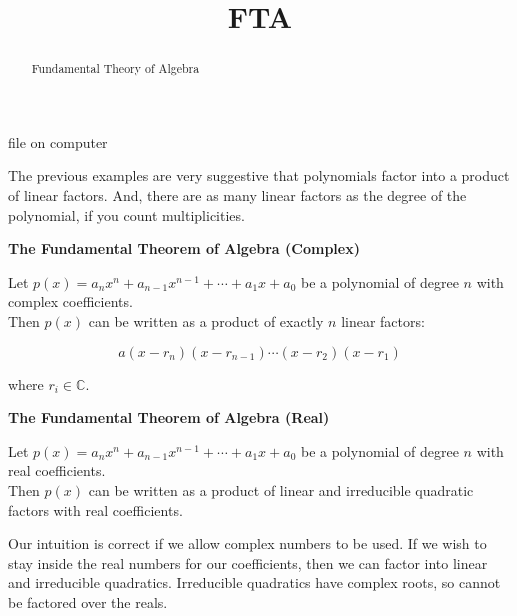 \documentclass{ximera}
\title{FTA}
\begin{document}
\begin{abstract}
Fundamental Theory of Algebra
\end{abstract}
\maketitle





file  on computer



The previous examples are very suggestive that polynomials factor into a product of linear factors.  And, there are as many linear factors as the degree of the polynomial, if you count multiplicities. \\






\begin{theorem} \textbf{\textcolor{green!50!black}{The Fundamental Theorem of Algebra (Complex)}} 



Let $p(x) = a_n x^n + a_{n-1} x^{n-1} + \cdots + a_1 x + a_0$ be a polynomial of degree $n$ with complex coefficients. \\


Then $p(x)$ can be written as a product of exactly $n$ linear factors:

\[
 a (x - r_n) (x - r_{n-1}) \cdots (x - r_2)  (x - r_1) 
\]


where $r_i \in \mathbb{C}$.


\end{theorem}








\begin{theorem} \textbf{\textcolor{green!50!black}{The Fundamental Theorem of Algebra (Real)}} 



Let $p(x) = a_n x^n + a_{n-1} x^{n-1} + \cdots + a_1 x + a_0$ be a polynomial of degree $n$ with real coefficients. \\


Then $p(x)$ can be written as a product of linear and irreducible quadratic factors with real coefficients.


\end{theorem}


Our intuition is correct if we allow complex numbers to be used.  If we wish to stay inside the real numbers for our coefficients, then we can factor into linear and irreducible quadratics.  Irreducible quadratics have complex roots, so cannot be factored over the reals.



\begin{idea}


\end{idea}
\end{document}
